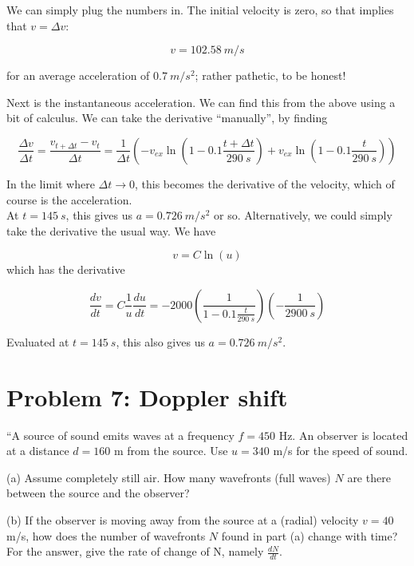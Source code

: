 \documentclass[8.01x]{subfiles}
\begin{document}
We can simply plug the numbers in. The initial velocity is zero, so that implies that $v = \Delta v$:

\begin{equation}
v = \SI{102.58}{m/s}
\end{equation}

for an average acceleration of $\SI{0.7}{m/s^2}$; rather pathetic, to be honest!

Next is the instantaneous acceleration. We can find this from the above using a bit of calculus. We can take the derivative ``manually'', by finding

\begin{equation}
\frac{\Delta v}{\Delta t} = \frac{v_{t + \Delta t} - v_t}{\Delta t} = \frac{1}{\Delta t}\left( - v_{ex} \ln \left(1 - 0.1 \frac{t + \Delta t}{\SI{290}{s}}\right) + v_{ex} \ln \left(1 - 0.1 \frac{t}{\SI{290}{s}}\right) \right)
\end{equation}

In the limit where $\Delta t \to 0$, this becomes the derivative of the velocity, which of course is the acceleration.\\
At $t = \SI{145}{s}$, this gives us $a = \SI{0.726}{m/s^2}$ or so. Alternatively, we could simply take the derivative the usual way. We have 

\begin{equation}
v = C \ln (u)
\end{equation}
which has the derivative

\begin{equation}
\frac{dv}{dt} = C \frac{1}{u} \frac{du}{dt} = -2000 \left( \frac{1}{1 - 0.1 \frac{t}{\SI{290}{s}}} \right) (-\frac{1}{\SI{2900}{s}})
\end{equation}

Evaluated at $t = \SI{145}{s}$, this also gives us $a = \SI{0.726}{m/s^2}$.

\section{Problem 7: Doppler shift}

``A source of sound emits waves at a frequency $f = 450$ Hz. An observer is located at a distance $d = 160$ m from the source. Use $u = 340$ m/s for the speed of sound.

(a) Assume completely still air. How many wavefronts (full waves) $N$ are there between the source and the observer?

(b) If the observer is moving away from the source at a (radial) velocity $v = 40$ m/s, how does the number of wavefronts $N$ found in part (a) change with time? For the answer, give the rate of change of N, namely $\displaystyle \frac{dN}{dt}$.
\end{document}
